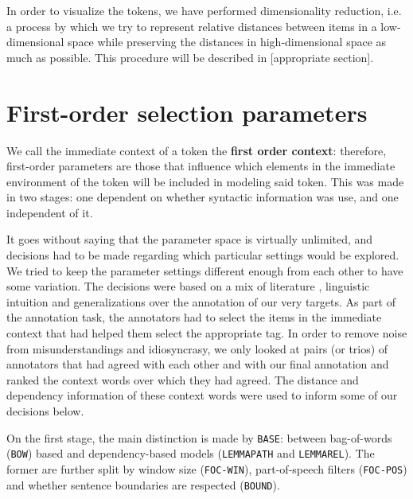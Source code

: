 \documentclass[
]{book}
\begin{document}
In order to visualize the tokens, we have performed dimensionality reduction, i.e.
a process by which we try to represent relative distances between items in a low-dimensional space
while preserving the distances in high-dimensional space as much as possible.
This procedure will be described in {[}appropriate section{]}.

\hypertarget{first-order-selection-parameters}{%
\section{First-order selection parameters}\label{first-order-selection-parameters}}

We call the immediate context of a token the \textbf{first order context}: therefore,
first-order parameters are those that influence which elements in the immediate environment
of the token will be included in modeling said token. This was made in two stages:
one dependent on whether syntactic information was use, and one independent of it.

It goes without saying that the parameter space is virtually unlimited, and decisions
had to be made regarding which particular settings would be explored. We tried to
keep the parameter settings different enough from each other to have some variation.
The decisions were based on a mix of literature \autocite{kiela.clark_2014},
linguistic intuition and generalizations over the annotation of our very targets.
As part of the annotation task, the annotators had to select the items in the
immediate context that had helped them select the appropriate tag. In order to remove
noise from misunderstandings and idiosyncrasy, we only looked at pairs (or trios) of
annotators that had agreed with each other and with our final annotation and ranked
the context words over which they had agreed. The distance and dependency information
of these context words were used to inform some of our decisions below.

On the first stage, the main distinction is made by \texttt{BASE}: between bag-of-words (\texttt{BOW}) based
and dependency-based models (\texttt{LEMMAPATH} and \texttt{LEMMAREL}).
The former are further split by window size (\texttt{FOC-WIN}), part-of-speech filters (\texttt{FOC-POS})
and whether sentence boundaries are respected (\texttt{BOUND}).
\end{document}
